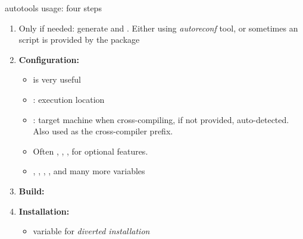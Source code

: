 \begin{frame}{autotools usage: four steps}
  \begin{enumerate}
  \item Only if needed: generate  and
    . Either using {\em autoreconf} tool, or
    sometimes an  script is provided by the package
  \item {\bf Configuration:} 
    \begin{itemize}
    \item {} is very useful
    \item {}: execution location
    \item {}: target machine when cross-compiling, if not
      provided, auto-detected. Also used as the cross-compiler prefix.
    \item Often , ,
      ,  for optional
      features.
    \item {}, , , ,
       and many more variables
    \end{itemize}
  \item {\bf Build:} 
  \item {\bf Installation:} 
    \begin{itemize}
    \item {} variable for {\em diverted installation}
    \end{itemize}
  \end{enumerate}
\end{frame}

